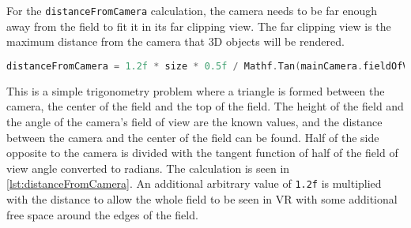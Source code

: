 For the \texttt{distanceFromCamera} calculation, the camera needs to be far enough away from the field to fit it in its far clipping view.
The far clipping view is the maximum distance from the camera that 3D objects will be rendered.
\begin{lstlisting}[caption={Calculation of the distance between the camera and field}, captionpos=b,language=C,label={lst:distanceFromCamera}]
    distanceFromCamera = 1.2f * size * 0.5f / Mathf.Tan(mainCamera.fieldOfView * 0.5f * Mathf.Deg2Rad);
\end{lstlisting}
This is a simple trigonometry problem where a triangle is formed between the camera, the center of the field and the top of the field.
The height of the field and the angle of the camera's field of view are the known values, and the distance between the camera and the center of the field can be found. 
Half of the side opposite to the camera is divided with the tangent function of half of the field of view angle converted to radians.
The calculation is seen in \autoref{lst:distanceFromCamera}.
An additional arbitrary value of \texttt{1.2f} is multiplied with the distance to allow the whole field to be seen in VR with some additional free space around the edges of the field.
